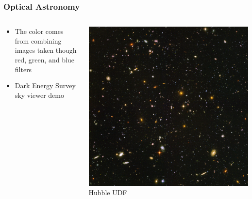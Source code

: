 \documentclass{beamer}
\begin{document}
\frame
{

    \frametitle{Optical Astronomy}


    \begin{columns}
        \begin{column}{0.5\textwidth}
            \begin{itemize}


                \item The color comes from combining images taken though red,
                    green, and blue filters

                \item Dark Energy Survey sky viewer demo

            \end{itemize}
        \end{column}
        \begin{column}{0.5\textwidth}
            \begin{center}
                \includegraphics[width=\textwidth]{UDF_half.jpg}
                \newline
                {\tiny Hubble UDF}
            \end{center}

            
        \end{column}
    \end{columns}


}
\end{document}
